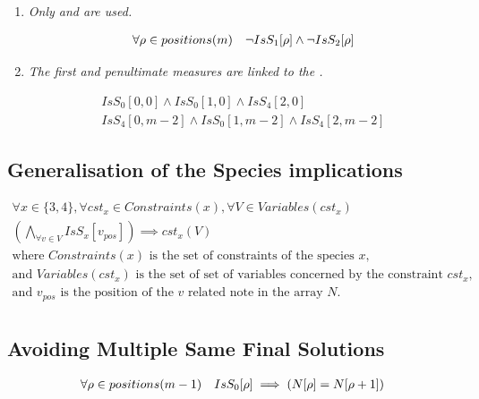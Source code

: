 \begin{enumerate}[wide, label=\bfseries 5.R\arabic*]
    \item \label{rhythm:not12} \textit{Only  and  are used.}

    \begin{equation}
        \begin{gathered}
            \forall \rho \in positions(m)\quad
            \lnot IsS_{1}[\rho] \land \lnot IsS_{2}[\rho]
        \end{gathered}
    \end{equation}

    \item \label{rhythm:syncinfirstpenult} \textit{The first and penultimate measures are linked to the .}
        
    \begin{equation}
        \begin{gathered}
            IsS_{0}[0, 0] \land IsS_{0}[1, 0] \land IsS_{4}[2, 0]\\
            IsS_{4}[0, m-2] \land IsS_{0}[1, m-2] \land IsS_{4}[2, m-2]
        \end{gathered}
    \end{equation}
\end{enumerate}

\subsection*{Generalisation of the Species implications}

\begin{equation}
    \begin{gathered}
        \forall x \in \{3, 4\}, \forall cst_{x} \in Constraints(x), \forall V \in Variables(cst_{x})\\
        \left(\bigwedge_{\forall v \in V} IsS_{x}[v_{pos}]\right) \implies cst_{x}(V)\\
        \text{where }Constraints(x) \text{ is the set of constraints of the species }x,\\
        \text{and }Variables(cst_{x}) \text{ is the set of set of variables concerned by the constraint }cst_{x},\\
        \text{and }v_{pos} \text{ is the position of the } v \text{ related note in the array }N.\\
    \end{gathered}
\end{equation}

\subsection*{Avoiding Multiple Same Final Solutions}
\begin{equation}
    \begin{gathered}
        \forall \rho \in positions(m-1)\quad
        IsS_{0}[\rho] \implies (N[\rho] = N[\rho + 1])
    \end{gathered}
\end{equation}

